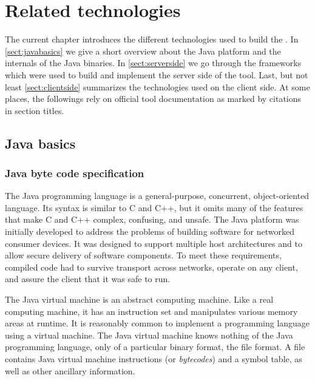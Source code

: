 \chapter{Related technologies}

The current chapter introduces the different technologies used to build the
\ptool{}. In \autoref{sect:javabasics} we give a short overview about the
Java platform and the internals of the Java binaries. In
\autoref{sect:serverside} we go through the frameworks which were used to build
and implement the server side of the tool. Last, but not least
\autoref{sect:clientside} summarizes the technologies used on the client side.
At some places, the followings rely on official tool documentation as marked by citations in
section titles.

\section{Java basics}\label{sect:javabasics}
 
\subsection{Java byte code specification~\cite{JavaSpec}}
The Java programming language is a general-purpose, concurrent,
object-oriented language. Its syntax is similar to C and C++, but it omits many
of the features that make C and C++ complex, confusing, and unsafe. The Java
platform was initially developed to address the problems of building software
for networked consumer devices. It was designed to support multiple host
architectures and to allow secure delivery of software components. To meet these
requirements, compiled code had to survive transport across networks, operate on
any client, and assure the client that it was safe to run.

The Java virtual machine is an abstract computing machine. Like a real computing
machine, it has an instruction set and manipulates various memory areas at
runtime. It is reasonably common to implement a programming language using a
virtual machine. The Java virtual machine knows nothing of the Java programming
language, only of a particular binary format, the   file format. A
 file contains Java virtual machine instructions (or 
\emph{bytecodes}) and a symbol table, as well as other ancillary information.

